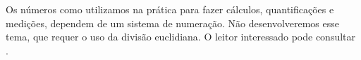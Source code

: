 \documentclass[../main.tex]{subfiles}
\begin{document}
Os números como utilizamos na prática para fazer cálculos, quantificações e medições, dependem de um sistema de numeração. Não desenvolveremos esse tema, que requer o uso da divisão euclidiana. O leitor interessado pode consultar \cite{hefez-algebra}.

\end{document}
